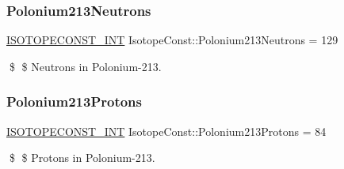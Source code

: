 \subsubsection{\texorpdfstring{Polonium213\+Neutrons}{Polonium213Neutrons}}
{\footnotesize\ttfamily \mbox{\hyperlink{group___isotope_const-_macros_ga5f18360b3e99483a35c32d789e62621c}{I\+S\+O\+T\+O\+P\+E\+C\+O\+N\+S\+T\+\_\+\+I\+NT}} Isotope\+Const\+::\+Polonium213\+Neutrons = 129}

\$ \$ Neutrons in Polonium-\/213. \mbox{\label{group___isotope_const-_polonium-_po213_ga4028fa5f24ff516207ae584aaa287454}} 
\subsubsection{\texorpdfstring{Polonium213\+Protons}{Polonium213Protons}}
{\footnotesize\ttfamily \mbox{\hyperlink{group___isotope_const-_macros_ga5f18360b3e99483a35c32d789e62621c}{I\+S\+O\+T\+O\+P\+E\+C\+O\+N\+S\+T\+\_\+\+I\+NT}} Isotope\+Const\+::\+Polonium213\+Protons = 84}

\$ \$ Protons in Polonium-\/213. 